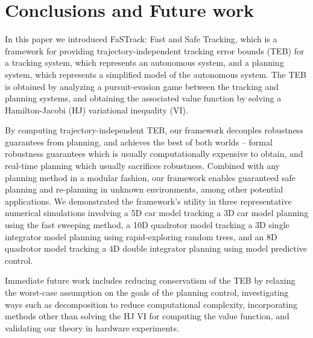\section{Conclusions and Future work}
In this paper we introduced FaSTrack: Fast and Safe Tracking, which is a framework for providing trajectory-independent tracking error bounds (TEB) for a tracking system, which represents an autonomous system, and a planning system, which represents a simplified model of the autonomous system.
The TEB is obtained by analyzing a pursuit-evasion game between the tracking and planning systems, and obtaining the associated value function by solving a Hamilton-Jacobi (HJ) variational inequality (VI).

By computing trajectory-independent TEB, our framework decouples robustness guarantees from planning, and achieves the best of both worlds -- formal robustness guarantees which is usually computationally expensive to obtain, and real-time planning which usually sacrifices robustness.
Combined with any planning method in a modular fashion, our framework enables guaranteed safe planning and re-planning in unknown environments, among other potential applications.
We demonstrated the framework's utility in three representative numerical simulations involving a 5D car model tracking a 3D car model planning using the fast sweeping method, a 10D quadrotor model tracking a 3D single integrator model planning using rapid-exploring random trees, and an 8D quadrotor model tracking a 4D double integrator planning using model predictive control.

Immediate future work includes reducing conservatism of the TEB by relaxing the worst-case assumption on the goals of the planning control, investigating ways such as decomposition to reduce computational complexity, incorporating methods other than solving the HJ VI for computing the value function, and validating our theory in hardware experiments.
